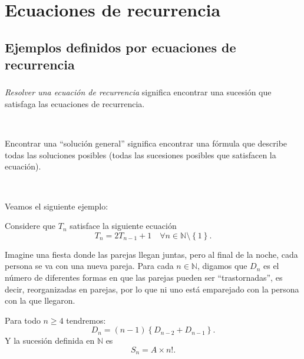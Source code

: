 \section{Ecuaciones de recurrencia}
\subsection{Ejemplos definidos por ecuaciones de recurrencia}

\begin{frame}
\frametitle{\secname}
\framesubtitle{\subsecname}

\textit{Resolver una ecuación de recurrencia} significa encontrar una sucesión que satisfaga las ecuaciones de recurrencia.

\

Encontrar una ``solución general'' significa encontrar una fórmula que describe todas las soluciones posibles (todas las sucesiones posibles que satisfacen la ecuación).

\

Veamos el siguiente ejemplo:

\begin{claim}
	Considere que $T_{n}$ satisface la siguiente ecuación
	\begin{equation}
	T_{n}=2T_{n-1}+1\quad\forall n\in\mathds{N}\setminus\left\{1\right\}.
	\end{equation}
\end{claim}

\end{frame}

\begin{frame}

\begin{example}[Desajustes]
	Imagine una fiesta donde las parejas llegan juntas, pero al final de la noche, cada persona se va con una nueva pareja. Para cada $n\in\mathds{N}$, digamos que $D_{n}$ es el número de diferentes formas en que las parejas pueden ser ``trastornadas'', es decir, reorganizadas en parejas, por lo que ni uno está emparejado con la persona con la que llegaron.
\end{example}

\begin{claim}
	Para todo $n\geq4$ tendremos: \[ D_{n}=(n-1)\left\{D_{n-2}+D_{n-1}\right\}. \] Y la sucesión definida en $\mathds{N}$ es \[ S_{n} = A \times n!. \]
\end{claim}

\end{frame}

